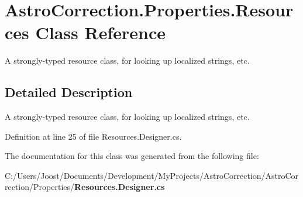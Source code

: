 \section{AstroCorrection.Properties.Resources Class Reference}
\label{class_astro_correction_1_1_properties_1_1_resources}


A strongly-\/typed resource class, for looking up localized strings, etc.  


\subsection{Detailed Description}
A strongly-\/typed resource class, for looking up localized strings, etc. 

Definition at line 25 of file Resources.Designer.cs.

The documentation for this class was generated from the following file:\begin{DoxyCompactItemize}
\item 
C:/Users/Joost/Documents/Development/MyProjects/AstroCorrection/AstroCorrection/Properties/{\bf Resources.Designer.cs}\end{DoxyCompactItemize}

